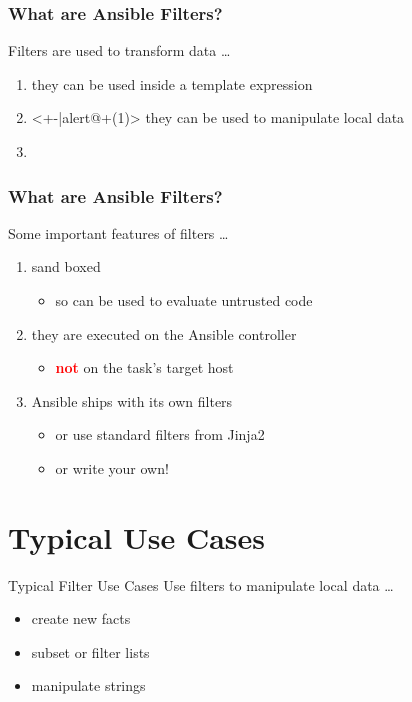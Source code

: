 \documentclass[pdf]{beamer}
\begin{document}
\begin{frame}
  \frametitle{What are Ansible Filters?}
  Filters are used to transform data \ldots
  \pause{}
  \begin{enumerate}
    \item<+-> {they can be used inside a template expression}
    \item<+-|alert@+(1)> {they can be used to manipulate local data}
    \item[]
  \end{enumerate}
\end{frame}

\begin{frame}
  \frametitle{What are Ansible Filters?}
  Some important features of filters \ldots
  \pause{}
  \begin{enumerate}[<+-|alert@+>]
    \item  sand boxed
      \begin{itemize}[<+-|alert@+>]
        \item so can be used to evaluate untrusted code
      \end{itemize}
    \item they are executed on the Ansible controller
      \begin{itemize}[<+-|alert@+>]
        \item \textcolor{red}{\textbf{not}} on the task's target host
      \end{itemize}
    \item Ansible ships with its own filters
      \begin{itemize}[<+-|alert@+>]
        \item or use standard filters from Jinja2
        \item or write your own!
      \end{itemize}
  \end{enumerate}
\end{frame}

\section{Typical Use Cases}

\begin{frame}[t,fragile]{Typical Filter Use Cases}
  Use filters to manipulate local data \ldots \pause
  \begin{itemize}
    \item<+-|alert@+> create new facts
       {}
    \item<+-|alert@+> subset or filter lists
       {}
    \item<+-|alert@+> manipulate strings
       {}
  \end{itemize}
\end{frame}
\end{document}
